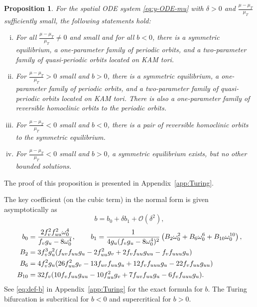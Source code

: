 \documentclass[11pt]{article}
\numberwithin{equation}{section}
\newtheorem{proposition}{Proposition}[section]
\begin{document}
\medskip
\begin{proposition} \label{prop:haragusiooss}
For the spatial ODE system \eqref{eq:y-ODE-mu} with $\delta>0$ and $\tfrac{\mu-{\mu}_T}{\mu_T}$ sufficiently small, the following statements hold:
\begin{enumerate}[(i)]
\item For all $\frac{\mu-\mu_T}{\mu_T}\ne 0$ and small and for all $b<0$, there is a symmetric equilibrium, a one-parameter family of periodic orbits, and a two-parameter family of quasi-periodic orbits located on KAM tori.
\item For $\frac{\mu-\mu_T}{\mu_T}>0$ small and $b>0$, there is a symmetric equilibrium, a one-parameter family of periodic orbits, and a two-parameter family of quasi-periodic orbits located on KAM tori. 
There is also a one-parameter family of reversible homoclinic orbits to the periodic orbits.
\item For $\frac{\mu-\mu_T}{\mu_T}<0$ small and $b<0$, 
there is a pair of reversible homoclinic orbits to the symmetric equilibrium.
\item For $\frac{\mu-\mu_T}{\mu_T}<0$ small and $b>0$, a symmetric equilibrium exists, but no other bounded solutions.
\end{enumerate}
\end{proposition}
%

\noindent
The proof of this proposition is presented in Appendix~\ref{app:Turing}.

\medskip

The key coefficient (on the cubic term) in the normal form is given asymptotically as
\begin{equation}\label{eq:b-exp}
b = b_0 + \delta b_1 + \mathcal{O}(\delta^2),
\end{equation}
\begin{equation}
\begin{split} 
b_0 &= \frac{2 f_v^2 f_{uu}^2 \omega_0^4}{f_v g_u - 8 \omega_0^4}, \hskip0.3truein 
b_1 = \frac{1}{4 g_u (f_vg_u - 8 \omega_0^4)^2} 
\left( B_2 \omega_0^2 + B_6 \omega_0^6 + B_{10} \omega_0^{10} \right), \\
B_2 &= 3 f_v^3 g_u^2 ( f_{uv}f_{uu}g_u - 2 f_{uu}^2 g_v + 2 f_v f_{uu} g_{uu} - f_v f_{uuu} g_u )\\
B_6 &=  4 f_v^2 g_u ( 26 f_{uu}^2 g_v - 13 f_{uv}f_{uu} g_u + 12 f_v f_{uuu} g_u -22 f_v f_{uu} g_{uu}) \\
B_{10} &= 32 f_v ( 10 f_v f_{uu} g_{uu} -10 f_{uu}^2 g_v + 7 f_{uv}f_{uu}g_u - 6 f_v f_{uuu} g_u).
\end{split}
\end{equation}
See \eqref{eq:def-b} in Appendix~\ref{app:Turing} for the exact formula for $b$.
The Turing bifurcation is subcritical for $b<0$ and supercritical for $b>0$.
\end{document}
